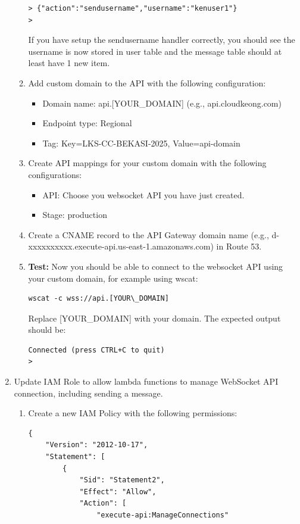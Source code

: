 \documentclass{article}
\begin{document}
\begin{enumerate}
\begin{enumerate}
\begin{verbatim}
> {"action":"sendusername","username":"kenuser1"}
> 
      \end{verbatim}
      If you have setup the sendusername handler correctly, you should see the username is now stored in user table and the message table should at least have 1 new item.
      \item Add custom domain to the API with the following configuration:
      \begin{itemize}
        \item Domain name: api.[YOUR\_DOMAIN] (e.g., api.cloudkeong.com)
        \item Endpoint type: Regional
        \item Tag: Key=LKS-CC-BEKASI-2025, Value=api-domain
      \end{itemize}
      \item Create API mappings for your custom domain with the following configurations:
      \begin{itemize}
        \item API: Choose you websocket API you have just created.
        \item Stage: production
      \end{itemize}
      \item Create a CNAME record to the API Gateway domain name (e.g., d-xxxxxxxxxx.execute-api.us-east-1.amazonaws.com) in Route 53.
      \item {\color{red}\textbf{Test:}} Now you should be able to connect to the websocket API using your custom domain, for example using wscat:
      \begin{verbatim}
wscat -c wss://api.[YOUR\_DOMAIN]
      \end{verbatim}
      Replace [YOUR\_DOMAIN] with your domain. The expected output should be:
      \begin{verbatim}
Connected (press CTRL+C to quit)
>
      \end{verbatim}
    \end{enumerate}
  \item Update IAM Role to allow lambda functions to manage WebSocket API connection, including sending a message.
    \begin{enumerate}
      \item Create a new IAM Policy with the following permissions:
    \begin{verbatim}
{
    "Version": "2012-10-17",
    "Statement": [
        {
            "Sid": "Statement2",
            "Effect": "Allow",
            "Action": [
                "execute-api:ManageConnections"

\end{verbatim}
\end{enumerate}
\end{enumerate}
\end{document}
